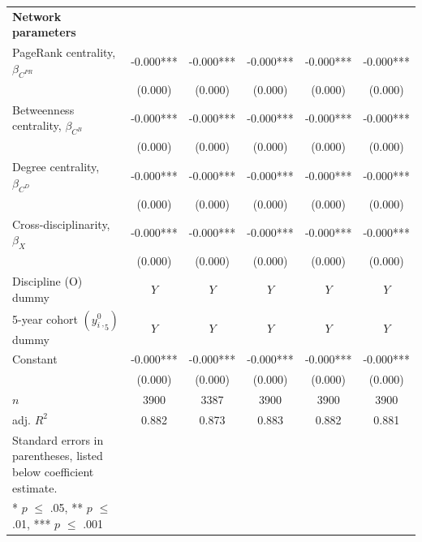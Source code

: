 \documentclass{article}\usepackage[]{graphicx}\usepackage[]{color}
\begin{document}
\begin{table}[h!]
\begin{center}
\begin{tabular}{l c c c c c}
    \hline
    
    \textbf {Network parameters}\\
    
    \rowcolor{gray!50}
    PageRank centrality, $\beta_{C^{PR}}$ 
    & -0.000*** & -0.000***  & -0.000*** & -0.000*** & -0.000*** \\
    {} 
    & (0.000)   & (0.000)    & (0.000)   & (0.000)   & (0.000) \\
    
    \rowcolor{gray!50}
    Betweenness centrality, $\beta_{C^{B}}$ 
    & -0.000*** & -0.000***  & -0.000*** & -0.000*** & -0.000*** \\
    {} 
    & (0.000)   & (0.000)    & (0.000)   & (0.000)   & (0.000) \\
    
    \rowcolor{gray!50}
    Degree centrality, $\beta_{C^{D}}$ 
    & -0.000*** & -0.000***  & -0.000*** & -0.000*** & -0.000*** \\
    {} 
    & (0.000)   & (0.000)    & (0.000)   & (0.000)   & (0.000) \\
    
    \rowcolor{gray!50}
    Cross-disciplinarity, $\beta_{X}$ 
    & -0.000*** & -0.000***  & -0.000*** & -0.000*** & -0.000*** \\
    {} 
    & (0.000)   & (0.000)    & (0.000)   & (0.000)   & (0.000) \\
    
    \hline
    
    \rowcolor{gray!50} 
    Discipline (O) dummy & $\textit{Y}$ & $\textit{Y}$ & $\textit{Y}$ & $\textit{Y}$ & $\textit{Y}$ \\
    
    \rowcolor{gray!50} 
    5-year cohort $(y{^0_i{_,}}_{5})$ dummy & $\textit{Y}$ & $\textit{Y}$ & $\textit{Y}$ & $\textit{Y}$ & $\textit{Y}$ \\
    
    \rowcolor{gray!50} 
    Constant 
    & -0.000*** & -0.000***  & -0.000*** & -0.000*** & -0.000*** \\
    {} 
    & (0.000)   & (0.000)    & (0.000)   & (0.000)   & (0.000) \\
    
    \hline
    
    \rowcolor{gray!50} 
    $\textit{n}$
    & 3900 & 3387 & 3900 & 3900 & 3900 \\
    
    \rowcolor{gray!50} 
    adj. ${R^2}$ 
    & 0.882 & 0.873 & 0.883 & 0.882 & 0.881 \\
    
    \hline
    \hline
    
    Standard errors in parentheses, listed below coefficient estimate. \\
    {* $\textit{p}$ $\leq$ .05, ** $\textit{p}$ $\leq$ .01, *** $\textit{p}$ $\leq$ .001}
    
  \end{tabular}
  \end{center}
\end{table}
\end{document}
